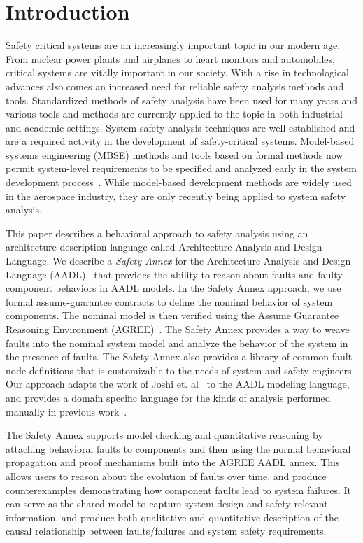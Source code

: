 \section{Introduction}
\label{sec:intro}
Safety critical systems are an increasingly important topic in our modern age. From nuclear power plants and airplanes to heart monitors and automobiles, critical systems are vitally important in our society. With a rise in technological advances also comes an increased need for reliable safety analysis methods and tools. Standardized methods of safety analysis have been used for many years and various tools and methods are currently applied to the topic in both industrial and academic settings. System safety analysis techniques are well-established and are a required activity in the development of safety-critical systems. Model-based systems engineering (MBSE) methods and tools based on formal methods now permit system-level requirements to be specified and analyzed early in the system development process~\cite{NFM2012:CoGaMiWhLaLu,CAV2015:BoCiGrMa}. While model-based development methods are widely used in the aerospace industry, they are only recently being applied to system safety analysis.  

This paper describes a behavioral approach to safety analysis using an architecture description language called Architecture Analysis and Design Language. We describe a {\em Safety Annex} for the Architecture Analysis and Design Language (AADL)~\cite{FeilerModelBasedEngineering2012} that provides the ability to reason about faults and faulty component behaviors in AADL models. In the Safety Annex approach, we use formal assume-guarantee contracts to define the nominal behavior of system components. The nominal model is then verified using the Assume Guarantee Reasoning Environment (AGREE)~\cite{NFM2012:CoGaMiWhLaLu}. The Safety Annex  provides a way to weave faults into the nominal system model and analyze the behavior of the system in the presence of faults. The Safety Annex also provides a library of common fault node definitions that is customizable to the needs of system and safety engineers. Our approach adapts the work of Joshi et. al~\cite{Joshi05:Dasc} to the AADL modeling language, and provides a domain specific language for the kinds of analysis performed manually in previous work~\cite{Stewart17:IMBSA}. 


The Safety Annex supports model checking and quantitative reasoning by attaching behavioral faults to components and then using the normal behavioral propagation and proof mechanisms built into the AGREE AADL annex. This allows users to reason about the evolution of faults over time, and produce counterexamples demonstrating how component faults lead to system failures. It can serve as the shared model to capture system design and safety-relevant information, and produce both qualitative and quantitative description of the causal relationship between faults/failures and system safety requirements.


